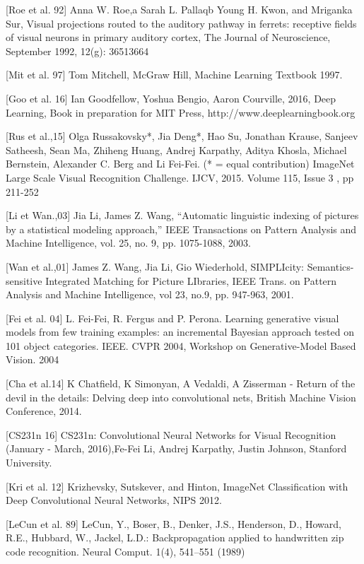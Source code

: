 [Roe et al. 92] Anna W. Roe,a Sarah L. Pallaqb Young H. Kwon, and Mriganka Sur, Visual projections routed to the auditory pathway in ferrets: receptive fields of visual neurons in primary auditory cortex, The Journal of Neuroscience, September 1992, 12(g): 36513664

[Mit et al. 97] Tom Mitchell, McGraw Hill, Machine Learning Textbook 1997.

[Goo et al. 16] Ian Goodfellow, Yoshua Bengio, Aaron Courville, 2016, Deep Learning, Book in preparation for MIT Press, http://www.deeplearningbook.org

[Rus et al.,15] Olga Russakovsky*, Jia Deng*, Hao Su, Jonathan Krause, Sanjeev Satheesh, Sean Ma, Zhiheng Huang, Andrej Karpathy, Aditya Khosla, Michael Bernstein, Alexander C. Berg and Li Fei-Fei. (* = equal contribution) ImageNet Large Scale Visual Recognition Challenge. IJCV, 2015. Volume 115, Issue 3 , pp 211-252 

[Li et Wan.,03] Jia Li, James Z. Wang, ``Automatic linguistic indexing of pictures by a statistical modeling approach,'' IEEE Transactions on Pattern Analysis and Machine Intelligence, vol. 25, no. 9, pp. 1075-1088, 2003.

[Wan et al.,01] James Z. Wang, Jia Li, Gio Wiederhold, SIMPLIcity: Semantics-sensitive Integrated Matching for Picture LIbraries, IEEE Trans. on Pattern Analysis and Machine Intelligence, vol 23, no.9, pp. 947-963, 2001.

[Fei et al. 04] L. Fei-Fei, R. Fergus and P. Perona. Learning generative visual models from few training examples: an incremental Bayesian approach tested on 101 object categories. IEEE. CVPR 2004, Workshop on Generative-Model Based Vision. 2004

[Cha et al.14] K Chatfield, K Simonyan, A Vedaldi, A Zisserman - Return of the devil in the details: Delving deep into convolutional nets, British Machine Vision Conference, 2014.

[CS231n 16] CS231n: Convolutional Neural Networks for Visual Recognition (January - March, 2016),Fe-Fei Li, Andrej Karpathy, Justin Johnson, Stanford University.

[Kri et al. 12] Krizhevsky, Sutskever, and Hinton, ImageNet Classification with Deep Convolutional Neural Networks, NIPS 2012.

[LeCun et al. 89] LeCun, Y., Boser, B., Denker, J.S., Henderson, D., Howard, R.E., Hubbard, W., Jackel, L.D.: Backpropagation applied to handwritten zip code recognition. Neural
Comput. 1(4), 541–551 (1989)

